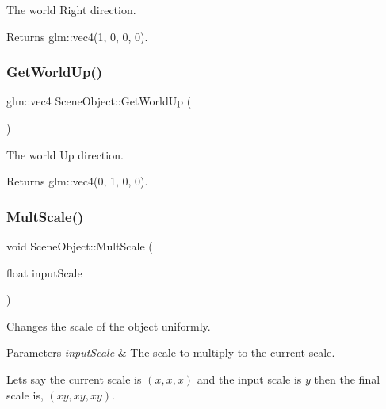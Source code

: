 The world \textquotesingle{}Right\textquotesingle{} direction. 

\begin{DoxyReturn}{Returns}
glm\+::vec4(1, 0, 0, 0). 
\end{DoxyReturn}
\hypertarget{class_scene_object_a334a5fb4e91d85fe6a046bd83dd235d3}{}\label{class_scene_object_a334a5fb4e91d85fe6a046bd83dd235d3} 
\subsubsection{\texorpdfstring{Get\+World\+Up()}{GetWorldUp()}}
{\footnotesize\ttfamily glm\+::vec4 Scene\+Object\+::\+Get\+World\+Up (\begin{DoxyParamCaption}{ }\end{DoxyParamCaption})\hspace{0.3cm}{\ttfamily [static]}}



The world \textquotesingle{}Up\textquotesingle{} direction. 

\begin{DoxyReturn}{Returns}
glm\+::vec4(0, 1, 0, 0). 
\end{DoxyReturn}
\hypertarget{class_scene_object_a00d73ad3f7d77bfc0d3c1869decb97ea}{}\label{class_scene_object_a00d73ad3f7d77bfc0d3c1869decb97ea} 
\subsubsection{\texorpdfstring{Mult\+Scale()}{MultScale()}}
{\footnotesize\ttfamily void Scene\+Object\+::\+Mult\+Scale (\begin{DoxyParamCaption}\item[{float}]{input\+Scale }\end{DoxyParamCaption})}



Changes the scale of the object uniformly. 


\begin{DoxyParams}{Parameters}
{\em input\+Scale} & The scale to multiply to the current scale.\\
\hline
\end{DoxyParams}
Let\textquotesingle{}s say the current scale is $(x, x, x)$ and the input scale is $y$ then the final scale is, $(xy, xy, xy)$. \hypertarget{class_scene_object_ad516b213a389f6fc57229f65086978ee}{}\label{class_scene_object_ad516b213a389f6fc57229f65086978ee} 
